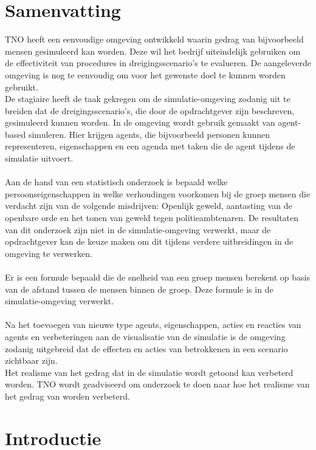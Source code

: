 \documentclass[12pt, letterpaper]{article}
\begin{document}
\newpage
\section*{Samenvatting}
TNO heeft een eenvoudige omgeving ontwikkeld waarin gedrag van bijvoorbeeld mensen gesimuleerd kan worden. Deze wil het bedrijf uiteindelijk gebruiken om de effectiviteit van procedures in dreigingsscenario's te evalueren. De aangeleverde omgeving is nog te eenvoudig om voor het gewenste doel te kunnen worden gebruikt. 
\\
De stagiaire heeft de taak gekregen om de simulatie-omgeving zodanig uit te breiden dat de dreigingsscenario's, die door de opdrachtgever zijn beschreven, gesimuleerd kunnen worden. In de omgeving wordt gebruik gemaakt van agent-based simuleren. Hier krijgen agents, die bijvoorbeeld personen kunnen representeren, eigenschappen en een agenda met taken die de agent tijdens de simulatie uitvoert.
\\ \\
Aan de hand van een statistisch onderzoek is bepaald welke persoonseigenschappen in welke verhoudingen voorkomen bij de groep mensen die verdacht zijn van de volgende misdrijven: Openlijk geweld, aantasting van de openbare orde en het tonen van geweld tegen politieambtenaren. De resultaten van dit onderzoek zijn niet in de simulatie-omgeving verwerkt, maar de opdrachtgever kan de keuze maken om dit tijdens verdere uitbreidingen in de omgeving te verwerken.
\\ \\
Er is een formule bepaald die de snelheid van een groep mensen berekent op basis van de afstand tussen de mensen binnen de groep. Deze formule is in de simulatie-omgeving verwerkt.
\\ \\
Na het toevoegen van nieuwe type agents, eigenschappen, acties en reacties van agents en verbeteringen aan de visualisatie van de simulatie is de omgeving zodanig uitgebreid dat de effecten en acties van betrokkenen in een scenario zichtbaar zijn.
\\Het realisme van het gedrag dat in de simulatie wordt getoond kan verbeterd worden. TNO wordt geadviseerd om onderzoek te doen naar hoe het realisme van het gedrag van worden verbeterd.

\newpage
\tableofcontents
\newpage

\section{Introductie} \label{intro}
\end{document}
